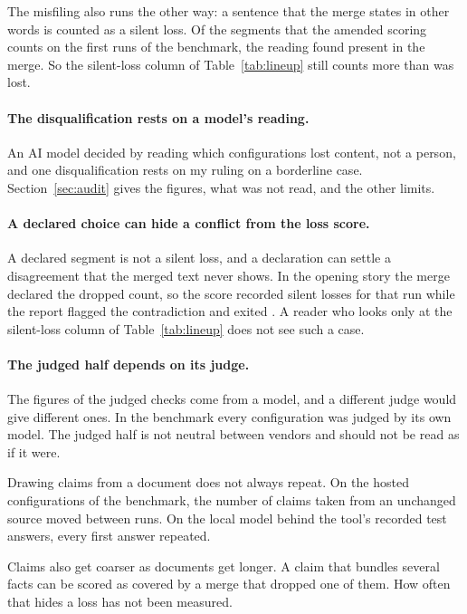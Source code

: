 The misfiling also runs the other way: a sentence that the merge states in other words is counted as a silent loss. Of the  segments that the amended scoring counts on the first runs of the benchmark, the reading found  present in the merge. So the silent-loss column of Table~\ref{tab:lineup} still counts more than was lost.

\paragraph{The disqualification rests on a model's reading.} An AI model decided by reading which configurations lost content, not a person, and one disqualification rests on my ruling on a borderline case. Section~\ref{sec:audit} gives the figures, what was not read, and the other limits.

\paragraph{A declared choice can hide a conflict from the loss score.} A declared segment is not a silent loss, and a declaration can settle a disagreement that the merged text never shows. In the opening story the merge declared the dropped count, so the score recorded  silent losses for that run while the report flagged the contradiction and exited . A reader who looks only at the silent-loss column of Table~\ref{tab:lineup} does not see such a case.

\paragraph{The judged half depends on its judge.} The figures of the judged checks come from a model, and a different judge would give different ones. In the benchmark every configuration was judged by its own model. The judged half is not neutral between vendors and should not be read as if it were.

Drawing claims from a document does not always repeat. On the hosted configurations of the benchmark, the number of claims taken from an unchanged source moved between runs. On the local model behind the tool's recorded test answers, every first answer repeated.

Claims also get coarser as documents get longer. A claim that bundles several facts can be scored as covered by a merge that dropped one of them. How often that hides a loss has not been measured.

